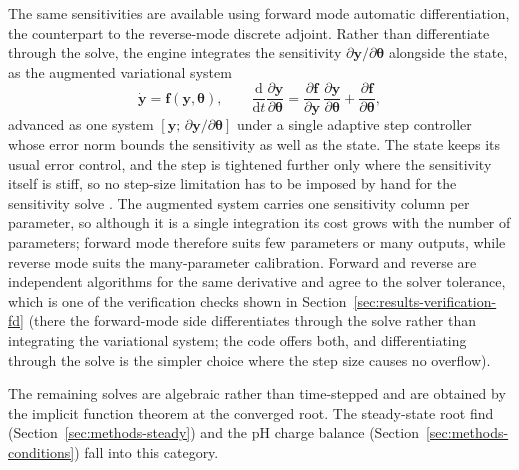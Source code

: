 \documentclass{article}
\begin{document}
The same sensitivities are available using forward mode automatic differentiation, the counterpart to the reverse-mode discrete adjoint. Rather than differentiate through the solve, the engine integrates the sensitivity \(\partial\mathbf{y}/\partial\boldsymbol{\theta}\) alongside the state, as the augmented variational system
\begin{equation}
  \dot{\mathbf{y}}=\mathbf{f}(\mathbf{y},\boldsymbol{\theta}),
  \qquad
  \frac{\mathrm{d}}{\mathrm{d}t}\frac{\partial\mathbf{y}}{\partial\boldsymbol{\theta}}
  =\frac{\partial\mathbf{f}}{\partial\mathbf{y}}\,\frac{\partial\mathbf{y}}{\partial\boldsymbol{\theta}}
  +\frac{\partial\mathbf{f}}{\partial\boldsymbol{\theta}},
  \label{eq:variational}
\end{equation}
advanced as one system \([\mathbf{y};\,\partial\mathbf{y}/\partial\boldsymbol{\theta}]\) under a single adaptive step controller whose error norm bounds the sensitivity as well as the state. The state keeps its usual error control, and the step is tightened further only where the sensitivity itself is stiff, so no step-size limitation has to be imposed by hand for the sensitivity solve \citep{hindmarsh2005}. The augmented system carries one sensitivity column per parameter, so although it is a single integration its cost grows with the number of parameters; forward mode therefore suits few parameters or many outputs, while reverse mode suits the many-parameter calibration. Forward and reverse are independent algorithms for the same derivative and agree to the solver tolerance, which is one of the verification checks shown in Section~\ref{sec:results-verification-fd} (there the forward-mode side differentiates through the solve rather than integrating the variational system; the code offers both, and differentiating through the solve is the simpler choice where the step size causes no overflow).

The remaining solves are algebraic rather than time-stepped and are obtained by the implicit function theorem at the converged root. The steady-state root find (Section~\ref{sec:methods-steady}) and the pH charge balance (Section~\ref{sec:methods-conditions}) fall into this category. 
\end{document}

